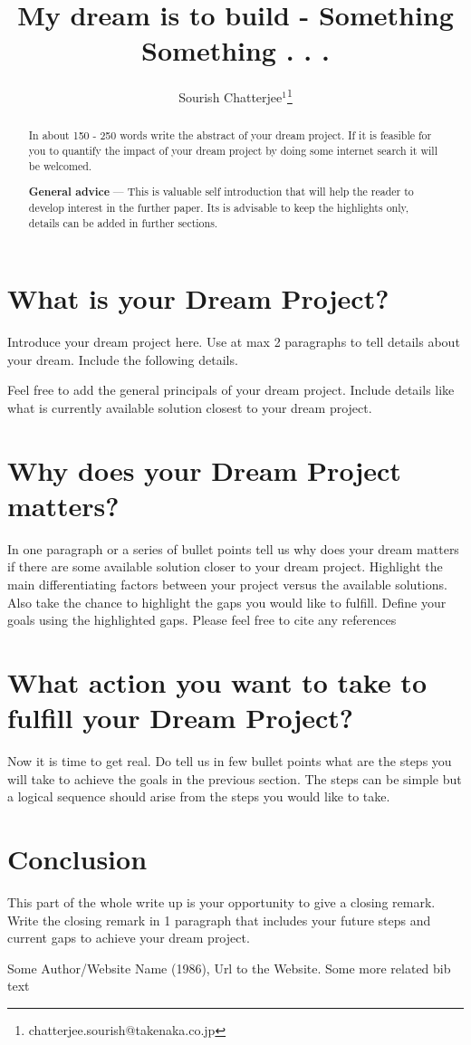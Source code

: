 \documentclass{article}
\title{My dream is to build - Something Something . . .}
\author{
Sourish Chatterjee$^1$\footnote{chatterjee.sourish@takenaka.co.jp}}
\begin{document}
\maketitle

\begin{abstract}
In about 150 - 250 words write the abstract of your dream project. If it is feasible for you to quantify the impact of your dream project by doing some internet search it will be welcomed. 
\par
\textbf{General advice} --- This is valuable self introduction that will help the reader to develop interest in the further paper. Its is advisable to keep the highlights only, details can be added in further sections.
\end{abstract}

\section{What is your Dream Project?}
Introduce your dream project here. Use at max 2 paragraphs to tell details about your dream. Include the following details.
\par
Feel free to add the general principals of your dream project.
Include details like what is currently available solution closest to your dream project. 

\section{Why does your Dream Project matters?}
In one paragraph or a series of bullet points tell us why does your dream matters if there are some available solution closer to your dream project. Highlight the main differentiating factors between your project versus the available solutions. Also take the chance to highlight the gaps you would like to fulfill. Define your goals using the highlighted gaps. Please feel free to cite any references \cite{texbook}

\section{What action you want to take to fulfill your Dream Project?}
Now it is time to get real. Do tell us in few bullet points what are the steps you will take to achieve the goals in the previous section. The steps can be simple but a logical sequence should arise from the steps you would like to take.

\section{Conclusion}
This part of the whole write up is your opportunity to give a closing remark. Write the closing remark in 1 paragraph that includes your future steps and current gaps to achieve your dream project.
\begin{thebibliography}{9}
Some Author/Website Name (1986), Url to the Website. Some more related bib text
\end{thebibliography}
\end{document}
